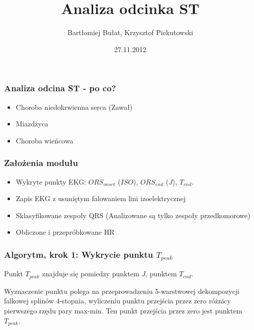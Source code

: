\documentclass{beamer}
\title[ST Interval]{Analiza odcinka ST}
\author[B. Bułat, K. Piekutowski]{Bartłomiej Bułat, Krzysztof Piekutowski}
\date[2012]{27.11.2012}
\institute[AGH]
{Wydział EAIiIB\\ 
Katedra Automatyki
}
\begin{document}
{
 \begin{frame}
   \titlepage
 \end{frame}
}


\begin{frame}
  \frametitle{Analiza odcina ST - po co?}

  \begin{itemize}
    \item Choroba niedokrwienna serca (Zawał)
    \item Miazdżyca
    \item Choroba wieńcowa
  \end{itemize}

\end{frame}

\begin{frame}
  \frametitle{Założenia modułu}
  \begin{itemize}
    \item Wykryte punkty EKG: $ORS_{onset}$ ($ISO$), $ORS_{end}$
      ($J$), $T_{end}$.
    \item Zapis EKG z usuniętym falowaniem lini izoelektrycznej
    \item Sklasyfikowane zespoły QRS (Analizowane są tylko zespoły
      przedkomorowe)
    \item Obliczone i przepróbkowane HR
  \end{itemize}
\end{frame}

\begin{frame}
  \frametitle{Algorytm, krok 1: Wykrycie punktu $T_{peak}$}

  Punkt $T_{peak}$ znajduje się pomiedzy punktem $J$, punktem $T_{end}$.

  

  Wyznaczenie punktu polega na przeprowadzeniu 5-warstwowej dekompozycji
  falkowej splinów 4-stopnia, wyliczeniu punktu przejścia przez zero różnicy
  pierwszego rzędu pary max-min. Ten punkt przejścia przez zero jest punktem
  $T_{peak}$.

\end{frame}
\end{document}

